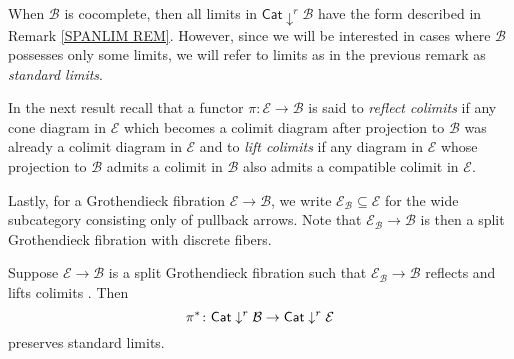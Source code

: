 \documentclass[a4paper,10pt
,draft
]{article}%
\renewcommand{\1}{\eta}%
\begin{document}
When $\mathcal{B}$ is cocomplete, then all limits in 
$\mathsf{Cat} \downarrow^r \mathcal{B}$
have the form described in Remark \ref{SPANLIM REM}.
However, since we will be interested in cases where 
$\mathcal{B}$ possesses only some limits,
we will refer to limits as in the previous remark as 
\textit{standard limits}.

In the next result recall that a functor 
$\pi \colon \mathcal{E} \to \mathcal{B}$
is said to \textit{reflect colimits} if any cone diagram in $\mathcal{E}$ which becomes a colimit diagram after projection to $\mathcal{B}$ was already a colimit diagram in $\mathcal{E}$
and to \textit{lift colimits} if any diagram in $\mathcal{E}$ whose projection to $\mathcal{B}$ admits a colimit in $\mathcal{B}$ also admits a compatible
colimit in $\mathcal{E}$.

Lastly, for a Grothendieck fibration 
$\mathcal{E} \to \mathcal{B}$, 
we write $\mathcal{E}_{\mathcal{B}}
\subseteq \mathcal{E}$
for the wide subcategory consisting only of pullback arrows. Note that 
$\mathcal{E}_{\mathcal{B}} \to \mathcal{B}$
is then a split Grothendieck fibration with discrete fibers.


\begin{proposition}\label{PRESSTLIM PROP}
Suppose $\mathcal{E} \to \mathcal{B}$ 
is a split Grothendieck fibration such that 
$\mathcal{E}_{\mathcal{B}} \to \mathcal{B}$ 
reflects and lifts colimits
. Then
\begin{equation}
\pi^{\**} \colon
\mathsf{Cat} \downarrow^r \mathcal{B} 
	\to
\mathsf{Cat} \downarrow^r \mathcal{E} 
\end{equation}
preserves standard limits.
\end{proposition}
\end{document}

